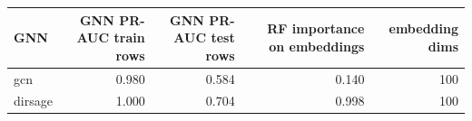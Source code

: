 \begin{tabular}{lrrrr}
\toprule
GNN & GNN PR-AUC train rows & GNN PR-AUC test rows & RF importance on embeddings & embedding dims \\
\midrule
gcn & 0.980 & 0.584 & 0.140 & 100 \\
dirsage & 1.000 & 0.704 & 0.998 & 100 \\
\bottomrule
\end{tabular}
